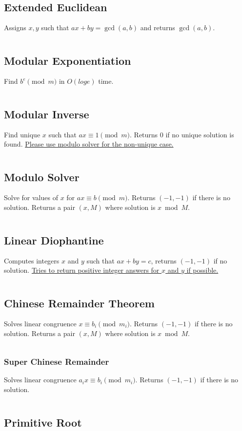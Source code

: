 \documentclass[8pt,a4paper,landscape,oneside]{amsart}
\newcommand{\code}[1]{\inputminted[fontsize=\normalsize,baselinestretch=1]{cpp}{_code/#1}}
\begin{document}
\begin{multicols*}{3}
  \subsection{Extended Euclidean}
    Assigns $x,y$ such that $ax + by = \gcd(a,b)$ and returns $\gcd(a,b)$.
    \code{numtheory/extended-euclidean.cpp}
  \subsection{Modular Exponentiation}
    Find $b^e \pmod m$ in $O(log e)$ time.
    \code{numtheory/mod_pow.cpp}
  \subsection{Modular Inverse}
    Find unique $x$ such that $ax \equiv 1 \pmod m$. Returns 0 if no unique solution is found. \underline{Please use modulo solver for the non-unique case.}
    \code{numtheory/modinv.cpp}
  \subsection{Modulo Solver}
    Solve for values of $x$ for $ax \equiv b \pmod m$. Returns $(-1,-1)$ if there is no solution. Returns a pair $(x, M)$ where solution is $x \bmod M$.
    \code{numtheory/modsolver.cpp}
  \subsection{Linear Diophantine}
    Computes integers $x$ and $y$ such that $ax+by=c$, returns $(-1,-1)$ if no solution. \underline{Tries to return positive integer answers for $x$ and $y$ if possible.}
    \code{numtheory/linear-diophantine.cpp}
  \subsection{Chinese Remainder Theorem}
    Solves linear congruence $x \equiv b_i \pmod {m_i}$. Returns $(-1,-1)$ if there is no solution. Returns a pair $(x, M)$ where solution is $x \bmod M$.
    \code{numtheory/chinese-remainder.cpp}
    \subsubsection{Super Chinese Remainder}
      Solves linear congruence $a_i x \equiv b_i \pmod {m_i}$. Returns $(-1,-1)$ if there is no solution.
      \code{numtheory/super-crt.cpp}
  \subsection{Primitive Root}
    \code{numtheory/primitive_root.cpp}

\end{multicols*}
\end{document}
